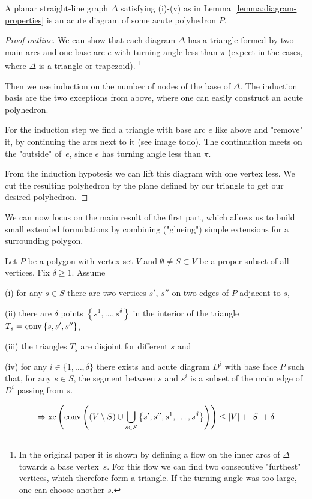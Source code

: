 \begin{lemma}
  A planar straight-line graph $\Delta$ satisfying (i)-(v) as in Lemma~\ref{lemma:diagram-properties} is an acute diagram of some acute polyhedron $P$.
\end{lemma}

\begin{proof}[Proof outline]
  We can show that each diagram $\Delta$ has a triangle formed by two main arcs and one base arc $e$ with turning angle less than $\pi$ (expect in the cases, where $\Delta$ is a triangle or trapezoid). \footnote{In the original paper it is shown by defining a flow on the inner arcs of $\Delta$ towards a base vertex~$s$. For this flow we can find two consecutive "furthest" vertices, which therefore form a triangle. If the turning angle was too large, one can choose another $s$.}

  Then we use induction on the number of nodes of the base of $\Delta$. The induction basis are the two exceptions from above, where one can easily construct an acute polyhedron.

  For the induction step we find a triangle with base arc $e$ like above and "remove" it, by continuing the arcs next to it (see image todo). The continuation meets on the "outside" of~$e$, since $e$ has turning angle less than $\pi$. 

  From the induction hypotesis we can lift this diagram with one vertex less. We cut the resulting polyhedron by the plane defined by our triangle to get our desired polyhedron.
\end{proof}

We can now focus on the main result of the first part, which allows us to build small extended formulations by combining ("glueing") simple extensions for a surrounding polygon.

\begin{theorem}\label{theorem:glueing}
  Let $P$ be a polygon with vertex set $V$ and $\emptyset \neq S \subset V$ be a proper subset of all vertices. Fix $\delta \geq 1$. Assume

  (i) for any $s \in S$ there are two vertices $s'$, $s''$ on two edges of $P$ adjacent to $s$,

  (ii) there are $\delta$ points $\left\{s^1, \dots, s^\delta \right\}$ in the interior of the triangle ${T_s = \operatorname{conv} \left\{s,s',s''\right\}}$,
  
  (iii) the triangles $T_s$ are disjoint for different $s$ and

  (iv) for any $i \in \{1,\dots,\delta\}$ there exists and acute diagram $D^i$ with base face $P$ such that, for any $s \in S$, the segment between $s$ and $s^i$ is a subset of the main edge of $D^i$ passing from $s$. 
  
  $$\Rightarrow \operatorname{xc}\left( \operatorname{conv}\left( (V \setminus S) \cup \bigcup_{s \in S} \left\{ s',s'',s^1,\dots,s^\delta \right\}  \right) \right) \leq \lvert V\rvert + \lvert S\rvert + \delta$$
\end{theorem}

